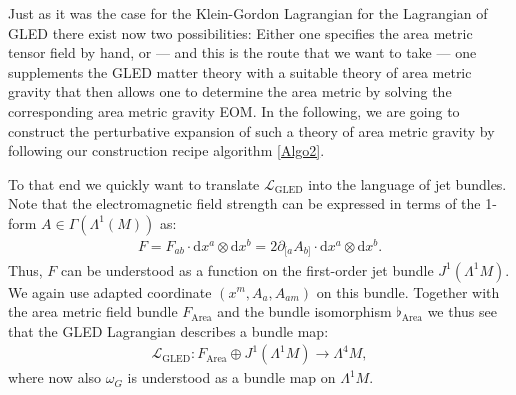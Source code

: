 Just as it was the case for the Klein-Gordon Lagrangian for the Lagrangian of GLED there exist now two possibilities: Either one specifies the area metric tensor field by hand, or --- and this is the route that we want to take --- one supplements the GLED matter theory with a suitable theory of area metric gravity that then allows one to determine the area metric by solving the corresponding area metric gravity EOM. 
In the following, we are going to construct the perturbative expansion of such a theory of area metric gravity by following our construction recipe algorithm \ref{Algo2}.

To that end we quickly want to translate $\mathcal{L}_{\text{GLED}}$ into the language of jet bundles. Note that the electromagnetic field strength can be expressed in terms of the 1-form $A \in \Gamma(\Lambda^1(M))$ as:
\begin{align}
F = F_{ab} \cdot  \mathrm{d}x^a \otimes \mathrm{d}x^b = 2 \partial_{[a} A_{b]} \cdot \mathrm{d}x^a \otimes \mathrm{d}x^b.
\end{align}
Thus, $F$ can be understood as a function on the first-order jet bundle $J^1(\Lambda^1M)$. We again use adapted coordinate $(x^m,A_a,A_{am})$ on this bundle. Together with the area metric field bundle $F_{\text{Area}}$ and the bundle isomorphism $\flat_{\text{Area}}$ we thus see that the GLED Lagrangian describes a bundle map:
\begin{align}
\mathcal{L}_{\text{GLED}} : F_{\text{Area}} \oplus J^1(\Lambda^1M) \rightarrow \Lambda^4M,
\end{align}
where now also $\omega_G$ is understood as a bundle map on $\Lambda^1M$.  

